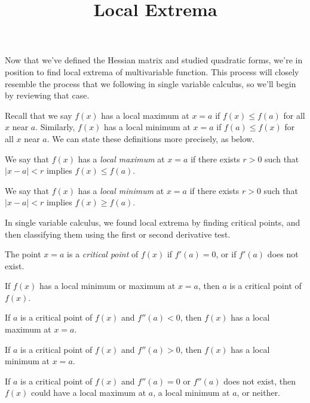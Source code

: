 \documentclass{ximera}
\title{Local Extrema}
\begin{document}
\begin{abstract}
\end{abstract}
\maketitle

Now that we've defined the Hessian matrix and studied quadratic forms, we're in position to find local extrema of multivariable function. This process will closely resemble the process that we following in single variable calculus, so we'll begin by reviewing that case.

Recall that we say $f(x)$ has a local maximum at $x=a$ if $f(x)\leq f(a)$ for all $x$ near $a$. Similarly, $f(x)$ has a local minimum at $x=a$ if $f(a)\leq f(x)$ for all $x$ near $a$. We can state these definitions more precisely, as below.

\begin{definition}
We say that $f(x)$ has a \emph{local maximum} at $x=a$ if there exists $r>0$ such that $|x-a|<r$ implies $f(x)\leq f(a)$.

We say that $f(x)$ has a \emph{local minimum} at $x=a$ if there exists $r>0$ such that $|x-a|<r$ implies $f(x)\geq f(a)$.
\end{definition}

In single variable calculus, we found local extrema by finding critical points, and then classifying them using the first or second derivative test.

\begin{definition}
The point $x=a$ is a \emph{critical point} of $f(x)$ if $f'(a)=0$, or if $f'(a)$ does not exist.
\end{definition}

\begin{proposition}
If $f(x)$ has a local minimum or maximum at $x=a$, then $a$ is a critical point of $f(x)$.

If $a$ is a critical point of $f(x)$ and $f''(a)<0$, then $f(x)$ has a local maximum at $x=a$.

If $a$ is a critical point of $f(x)$ and $f''(a)>0$, then $f(x)$ has a local minimum at $x=a$.

If $a$ is a critical point of $f(x)$ and $f''(a)=0$ or $f''(a)$ does not exist, then $f(x)$ could have a local maximum at $a$, a local minimum at $a$, or neither.
\end{proposition}
\end{document}
